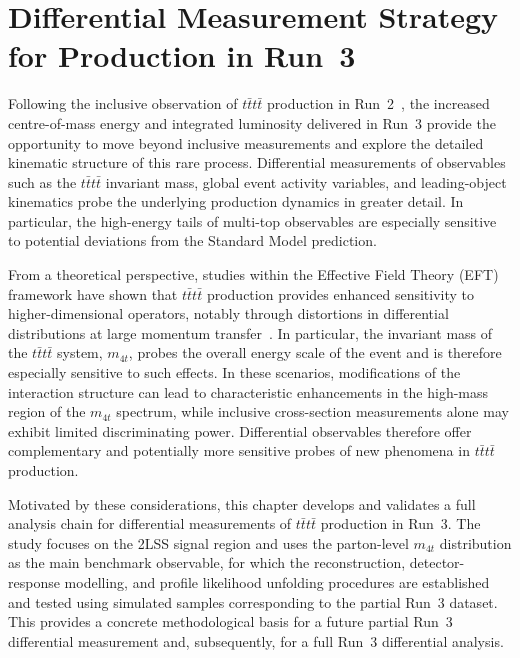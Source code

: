 ﻿%

\chapter{Differential Measurement Strategy for \tttthead{} Production in Run~3}
\label{chap:Difftttt}

Following the inclusive observation of $t\bar{t}t\bar{t}$ production in Run~2~\cite{ATLAS:2023ajo}, the increased centre-of-mass energy and integrated luminosity delivered in Run~3 provide the opportunity to move beyond inclusive measurements and explore the detailed kinematic structure of this rare process.
Differential measurements of observables such as the $t\bar{t}t\bar{t}$ invariant mass, global event activity variables, and leading-object kinematics probe the underlying production dynamics in greater detail. In particular, the high-energy tails of multi-top observables are especially sensitive to potential deviations from the Standard Model prediction.

From a theoretical perspective, studies within the Effective Field Theory (EFT) framework have shown that $t\bar{t}t\bar{t}$ production provides enhanced sensitivity to higher-dimensional operators, notably through distortions in differential distributions at large momentum transfer~\cite{FourTopEFTStudy}. 
In particular, the invariant mass of the $t\bar{t}t\bar{t}$ system, $m_{4t}$, probes the overall energy scale of the event and is therefore especially sensitive to such effects. 
In these scenarios, modifications of the interaction structure can lead to characteristic enhancements in the high-mass region of the $m_{4t}$ spectrum, while inclusive cross-section measurements alone may exhibit limited discriminating power. 
Differential observables therefore offer complementary and potentially more sensitive probes of new phenomena in $t\bar{t}t\bar{t}$ production.

Motivated by these considerations, this chapter develops and validates a full analysis chain for differential measurements of $t\bar{t}t\bar{t}$ production in Run~3. 
The study focuses on the 2LSS signal region and uses the parton-level $m_{4t}$ distribution as the main benchmark observable, for which the reconstruction, detector-response modelling, and profile likelihood unfolding procedures are established and tested using simulated samples corresponding to the partial Run~3 dataset. 
This provides a concrete methodological basis for a future partial Run~3 differential measurement and, subsequently, for a full Run~3 differential analysis.

